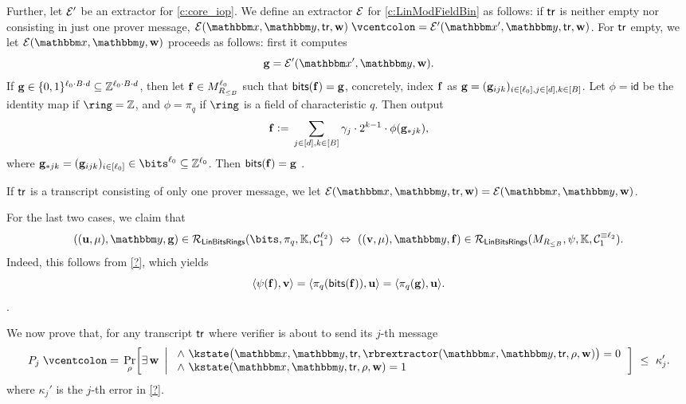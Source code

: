 \documentclass[11pt,letterpaper,usenames,dvipsnames]{article}
\begin{document}
Further, let $\mathcal{E}'$ be an extractor for \cref{c:core_iop}. We define an extractor $\mathcal{E}$ for \cref{c:LinModFieldBin} as follows: if $\mathsf{tr}$ is neither empty nor consisting in just one prover message, $\cE(\inp,\oracle,\tr, \ww) \defeq \cE'(\inp', \oracle, \tr, \ww)$. For $\mathsf{tr}$ empty, we let $\cE(\inp, \oracle, \ww)$ proceeds as follows: first it computes $$\bfg=\cE'(\inp',\oracle, \ww).$$  If $\mathbf{g}\in \{0,1\}^{\ell_0\cdot B \cdot d} \subseteq \mathbb{Z}^{\ell_0\cdot B \cdot d}$, then let $\mathbf{f}\in M_{R_{\leq B}}^{\ell_0}$ such that $\mathsf{bits}(\mathbf{f})=\mathbf{g}$, concretely, index $\mathbf{f}$ as $\mathbf{g}=(\mathbf{g}_{ijk})_{i\in [\ell_0], j\in [d], k\in [B]}$. Let $\phi= \mathsf{id}$ be the identity map if $\ring=\ZZ$, and $\phi=\pi_q$ if $\ring$ is a field of characteristic $q$. Then output 
%
$$
\mathbf{f} {\;\vcentcolon=\;}  \sum_{j\in [d],k\in [B]} \gamma_j \cdot 2^{k-1} \cdot \phi(\mathbf{g}_{*jk}),
$$
where $\bfg_{*jk}=(\bfg_{ijk})_{i\in [\codedim_0]}\in \bits^{\codedim_0} \subseteq \ZZ^{\codedim_0}$. Then $\mathsf{bits}(\mathbf{f})=\mathbf{g}$ . 

If $\mathsf{tr}$ is a transcript consisting of only one prover message, we let $\cE(\inp,\oracle, \tr,\ww) = \cE(\inp,\oracle,\ww)$.



For the last two cases, we claim that 
%
$$
((\uu,\mu),\oracle, \bfg) \in \LinBitsDual(\bits,\pi_q,\KK,\cC_1^{\codedim_2}) \ \Leftrightarrow \ ((\vv,\mu),\oracle, \bff) \in \LinModFieldBin(M_{R_{\leq B}},\modulemorphism, \KK, \cC_1^{\equiv \codedim_2}).
$$
%
Indeed, this follows from \cref{?}, which yields $$\langle \psi(\mathbf{f}), \mathbf{v}\rangle = \langle \pi_q(\mathsf{bits}(\mathbf{f})), \mathbf{u} \rangle = \langle \pi_q(\mathbf{g}), \mathbf{u} \rangle.$$ .



We now prove that, for any transcript $\mathsf{tr}$ where verifier is about to send its $j$-th message
\[
  P_j\defeq \Pr_{\rho}\!\left[
  \exists\,\ww \ \left| \ \begin{array}{l}
  \wedge\ \kstate\bigl(\inp,\oracle,\tr,\rbrextractor(\inp,\oracle,\tr, \rho,\ww)\bigr)=0\\
  \wedge\ \kstate(\inp,\oracle,\tr, \rho,  \ww)=1
  \end{array}
  \right.\right]
  \ \le\ \kappa_j'.
\]
where $\kappa_j'$ is the $j$-th error in \cref{?}.
\end{document}

